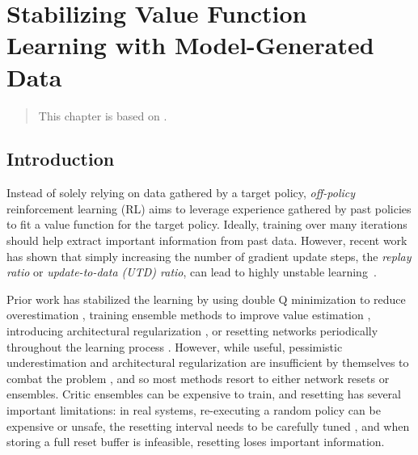\chapter{Stabilizing Value Function Learning with Model-Generated Data}
\label{chap:mad}

\begin{quote}
    This chapter is based on .
\end{quote}


\newcommand{\blue}[1]{{\color{uoftoceanblue} #1}}
\newcommand{\red}[1]{{\color{uoftred} #1}}

\section{Introduction}

Instead of solely relying on data gathered by a target policy, \emph{off-policy} reinforcement learning (RL) aims to leverage experience gathered by past policies \parencite{suttonbook} to fit a value function for the target policy. 
Ideally, training over many iterations should help extract important information from past data.
However, recent work has shown that simply increasing the number of gradient update steps, the \emph{replay ratio} or \emph{update-to-data (UTD) ratio}, can lead to highly unstable learning~\parencite{nikishin2022primacy,doro2023barrier,hussing2024dissecting,nauman2024bigger}.

Prior work has stabilized the learning by using double Q minimization to reduce overestimation \parencite{fujimoto2018addressing}, training ensemble methods to improve value estimation \parencite{chen2021randomized,hiraoka2022dropout}, introducing architectural regularization \parencite{hussing2024dissecting,nauman2024bigger}, or resetting networks periodically throughout the learning process \parencite{doro2023barrier,schwarzer2023bigger,nauman2024bigger}.
However, while useful, pessimistic underestimation and architectural regularization are insufficient by themselves  to combat the problem \parencite{hussing2024dissecting}, and so most methods resort to either network resets or ensembles.
Critic ensembles can be expensive to train, and resetting has several important limitations: in real systems, re-executing a random policy can be expensive or unsafe, the resetting interval needs to be carefully tuned \parencite{hussing2024dissecting}, and when storing a full reset buffer is infeasible, resetting loses important information.

